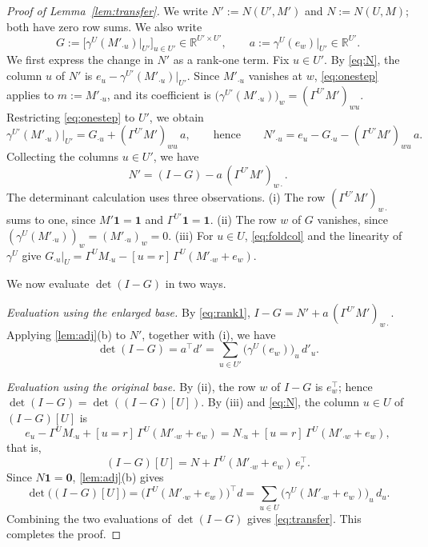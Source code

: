 \documentclass[onefignum,onetabnum]{siamart250211}
\numberwithin{theorem}{section}
\numberwithin{equation}{section}
\newcommand{\R}{\mathbb{R}}
\newcommand{\one}{\mathbf{1}}
\newcommand{\zero}{\mathbf{0}}
\begin{document}
\begin{proof}[Proof of Lemma~\ref{lem:transfer}]
We write $N':=N(U',M')$ and $N:=N(U,M)$; both have zero row sums. We
also write
\[
G:=\Big[\gamma^{U}(M'_{\cdot u})\big|_{U'}\Big]_{u\in U'}\in\R^{U'\times U'},
\qquad
a:=\gamma^{U}(e_w)\big|_{U'}\in\R^{U'} .
\]
We first express the change in $N'$ as a rank-one term. Fix
$u\in U'$. By
\eqref{eq:N}, the column $u$ of $N'$ is
$e_u-\gamma^{U'}(M'_{\cdot u})\big|_{U'}$. Since $M'_{\cdot u}$
vanishes at $w$, \eqref{eq:onestep} applies to $m:=M'_{\cdot u}$, and
its coefficient is $\big(\gamma^{U'}(M'_{\cdot u})\big)_w
=(\Gamma^{U'}M')_{wu}$. Restricting \eqref{eq:onestep} to $U'$, we
obtain
\[
\gamma^{U'}(M'_{\cdot u})\big|_{U'}=G_{\cdot u}+(\Gamma^{U'}M')_{wu}\,a,
\qquad\text{hence}\qquad
N'_{\cdot u}=e_u-G_{\cdot u}-(\Gamma^{U'}M')_{wu}\,a .
\]
Collecting the columns $u\in U'$, we have
\begin{equation}\label{eq:rank1}
N'=(I-G)-a\,(\Gamma^{U'}M')_{w\cdot} .
\end{equation}
The determinant calculation uses three observations. (i) The row $(\Gamma^{U'}M')_{w\cdot}$ sums to one,
since $M'\one=\one$ and $\Gamma^{U'}\one=\one$. (ii) The row $w$ of $G$
vanishes, since $(\gamma^{U}(M'_{\cdot u}))_w=(M'_{\cdot u})_w=0$.
(iii) For $u\in U$, \eqref{eq:foldcol} and the linearity of
$\gamma^U$ give
$G_{\cdot u}|_U=\Gamma^{U}M_{\cdot u}-[u=r]\,\Gamma^{U}(M'_{\cdot w}+e_w)$.

We now evaluate $\det(I-G)$ in two ways.

\emph{Evaluation using the enlarged base.} By \eqref{eq:rank1},
$I-G=N'+a\,(\Gamma^{U'}M')_{w\cdot}$. Applying \cref{lem:adj}(b) to
$N'$, together with (i), we have
\begin{equation}\label{eq:Dleft}
\det(I-G)=a^{\top}d'=\sum_{u\in U'}\big(\gamma^{U}(e_w)\big)_u\,d'_u .
\end{equation}

\emph{Evaluation using the original base.} By (ii), the row $w$ of $I-G$ is $e_w^{\top}$;
hence $\det(I-G)=\det((I-G)[U])$. By (iii) and \eqref{eq:N}, the
column $u\in U$ of $(I-G)[U]$ is
\[
e_u-\Gamma^UM_{\cdot u}+[u=r]\,\Gamma^U(M'_{\cdot w}+e_w)
=N_{\cdot u}+[u=r]\,\Gamma^U(M'_{\cdot w}+e_w),
\]
that is,
\begin{equation}\label{eq:Dblock}
(I-G)[U]=N+\Gamma^{U}(M'_{\cdot w}+e_w)\,e_r^{\top} .
\end{equation}
Since $N\one=\zero$, \cref{lem:adj}(b) gives
\[
\det\big((I-G)[U]\big)=\big(\Gamma^{U}(M'_{\cdot w}+e_w)\big)^{\top}d
=\sum_{u\in U}\big(\gamma^{U}(M'_{\cdot w}+e_w)\big)_u\,d_u .
\]
Combining the two evaluations of $\det(I-G)$ gives \eqref{eq:transfer}.
This completes the proof.
\end{proof}
\end{document}
